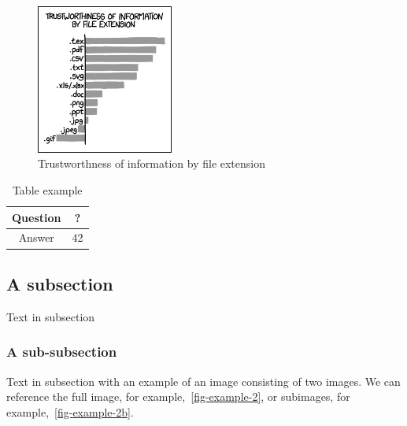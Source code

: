 \documentclass[intlimits,twoside,a4paper,11pt]{article}
\begin{document}
    \begin{figure}[htb]
        \centering
        \includegraphics[width=0.4\textwidth]{xkcd1301.png}
        \caption{Trustworthness of information by file extension} \label{fig-example}
    \end{figure}

    \begin{table}[H]
        \centering
        \caption{Table example}
        \label{table-example}
        \begin{tabular}{|c|c|}
            \hline
            Question & ? \\
            \hline
            Answer & 42 \\
            \hline
        \end{tabular}
    \end{table}

    \subsection{A subsection}
    Text in subsection
    \subsubsection{A sub-subsection}
    Text in subsection with an example of an image consisting of two images. We can reference the full image, for example,~\ref{fig-example-2}, or subimages, for example,~\ref{fig-example-2b}.
\end{document}

